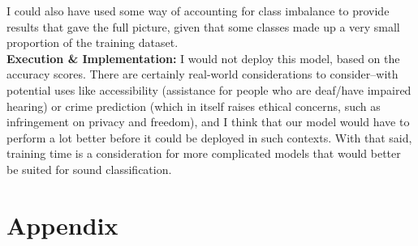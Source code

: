 \documentclass[11pt]{article}
\begin{document}
\noindent I could also have used some way of accounting for class imbalance to provide results that gave the full picture, given that some classes made up a very small proportion of the training dataset.
\\

\noindent \textbf{Execution \& Implementation:} I would not deploy this model, based on the accuracy scores. There are certainly real-world considerations to consider–with potential uses like accessibility (assistance for people who are deaf/have impaired hearing) or crime prediction (which in itself raises ethical concerns, such as infringement on privacy and freedom), and I think that our model would have to perform a lot better before it could be deployed in such contexts. With that said, training time is a consideration for more complicated models that would better be suited for sound classification.


\newpage
\section{Appendix}

\listoftables
\vspace{5pt}
\end{document}

